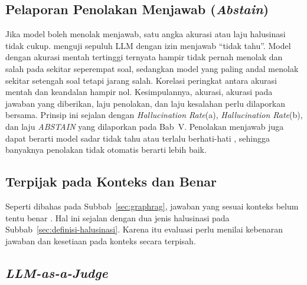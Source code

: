 \subsection{Pelaporan Penolakan Menjawab (\emph{Abstain})}
\label{sec:abstain}

Jika model boleh menolak menjawab, satu angka akurasi atau laju halusinasi tidak cukup. \textcite{Cetinkaya2026} menguji sepuluh LLM dengan izin menjawab ``tidak tahu''. Model dengan akurasi mentah tertinggi ternyata hampir tidak pernah menolak dan salah pada sekitar seperempat soal, sedangkan model yang paling andal menolak sekitar setengah soal tetapi jarang salah. Korelasi peringkat antara akurasi mentah dan keandalan hampir nol. Kesimpulannya, akurasi, akurasi pada jawaban yang diberikan, laju penolakan, dan laju kesalahan perlu dilaporkan bersama. Prinsip ini sejalan dengan \emph{Hallucination Rate}(a), \emph{Hallucination Rate}(b), dan laju \emph{ABSTAIN} yang dilaporkan pada Bab~V. Penolakan menjawab juga dapat berarti model sadar tidak tahu atau terlalu berhati-hati \autocite{Cetinkaya2026}, sehingga banyaknya penolakan tidak otomatis berarti lebih baik.

\subsection{Terpijak pada Konteks dan Benar}

Seperti dibahas pada Subbab~\ref{sec:graphrag}, jawaban yang sesuai konteks belum tentu benar \autocite{Pandilova2026}. Hal ini sejalan dengan dua jenis halusinasi pada Subbab~\ref{sec:definisi-halusinasi}. Karena itu evaluasi perlu menilai kebenaran jawaban dan kesetiaan pada konteks secara terpisah.

\subsection{\emph{LLM-as-a-Judge}}

